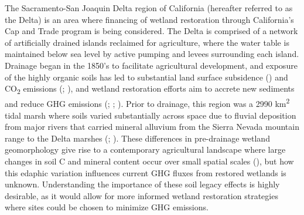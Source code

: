 \documentclass[
  12pt,
]{article}
\begin{document}
The Sacramento-San Joaquin Delta region of California (hereafter
referred to as the Delta) is an area where financing of wetland
restoration through California's Cap and Trade program is being
considered. The Delta is comprised of a network of artificially drained
islands reclaimed for agriculture, where the water table is maintained
below sea level by active pumping and levees surrounding each island.
Drainage began in the 1850's to facilitate agricultural development, and
exposure of the highly organic soils has led to substantial land surface
subsidence () and CO\textsubscript{2} emissions
(;
), and
wetland restoration efforts aim to accrete new sediments and reduce GHG
emissions (; ;
).
Prior to drainage, this region was a 2990 km\textsuperscript{2} tidal
marsh where soils varied substantially across space due to fluvial
deposition from major rivers that carried mineral alluvium from the
Sierra Nevada mountain range to the Delta marshes
(;
). These
differences in pre-drainage wetland geomorphology give rise to a
contemporary agricultural landscape where large changes in soil C and
mineral content occur over small spatial scales
(), but how this
edaphic variation influences current GHG fluxes from restored wetlands
is unknown. Understanding the importance of these soil legacy effects is
highly desirable, as it would allow for more informed wetland
restoration strategies where sites could be chosen to minimize GHG
emissions.
\end{document}
